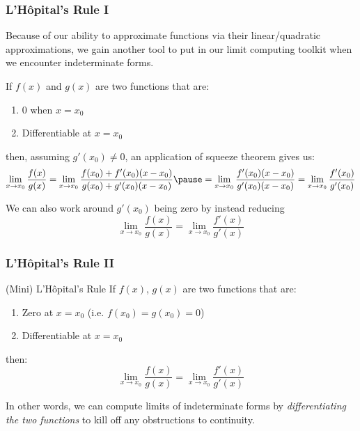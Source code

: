 \documentclass{ltx-talk}
\begin{document}
\begin{frame}
  \frametitle{L'Hôpital's Rule I}

  Because of our ability to approximate functions via their linear/quadratic approximations, we gain another tool to put in our limit computing toolkit
  when we encounter indeterminate forms. \pause

  If $f(x)$ and $g(x)$ are two functions that are: \pause
  \begin{enumerate}
    \item $0$ when $x = x_0$ \pause
    \item Differentiable at $x = x_0$ \pause
  \end{enumerate}

  then, assuming $g'(x_0) \neq 0$, an application of squeeze theorem
  gives us:
  \begin{equation}
    \lim\limits_{x \rightarrow x_0} \dfrac{f(x)}{g(x)} = \lim\limits_{x \rightarrow x_0} \dfrac{f(x_0) + f'(x_0)(x - x_0)}{g(x_0) + g'(x_0)(x - x_0)} \pause = \lim\limits_{x \rightarrow x_0} \dfrac{f'(x_0)(x - x_0)}{g'(x_0)(x - x_0)} = \lim\limits_{x \rightarrow x_0} \dfrac{f'(x_0)}{g'(x_0)} 
  \end{equation} \pause

  We can also work around $g'(x_0)$ being zero by instead reducing
  \begin{equation}
    \lim\limits_{x \rightarrow x_0} \dfrac{f(x)}{g(x)} = \lim\limits_{x \rightarrow x_0} \dfrac{f'(x)}{g'(x)}
  \end{equation}
\end{frame}

\begin{frame}
  \frametitle{L'Hôpital's Rule II}

  \begin{alertblock}{(Mini) L'Hôpital's Rule}
    If $f(x)$, $g(x)$ are two functions that are:
    \begin{enumerate}
      \item Zero at $x = x_0$ (i.e. $f(x_0) = g(x_0) = 0$)
      \item Differentiable at $x = x_0$
    \end{enumerate}
    then:
    \begin{equation}
      \lim\limits_{x \rightarrow x_0} \dfrac{f(x)}{g(x)} = \lim\limits_{x \rightarrow x_0} \dfrac{f'(x)}{g'(x)}
    \end{equation}
  \end{alertblock} \pause

  In other words, we can compute limits of indeterminate forms by \textit{differentiating the two functions} to kill off any obstructions to continuity.
\end{frame}
\end{document}
